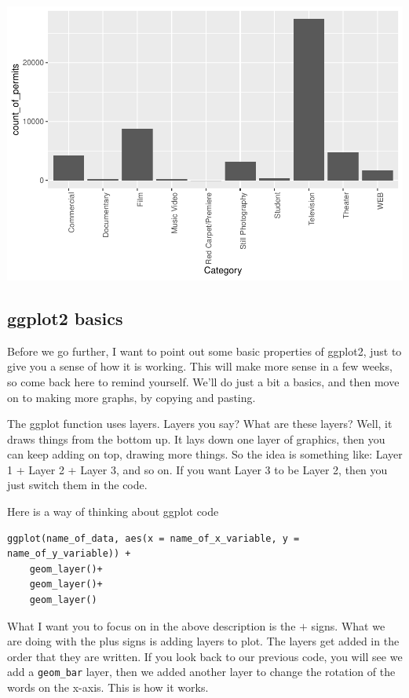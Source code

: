 \documentclass[]{book}
\begin{document}
\includegraphics{Statistics_Lab_files/figure-latex/1categoryB-1.pdf}

\subsection{ggplot2 basics}\label{ggplot2-basics}

Before we go further, I want to point out some basic properties of
ggplot2, just to give you a sense of how it is working. This will make
more sense in a few weeks, so come back here to remind yourself. We'll
do just a bit a basics, and then move on to making more graphs, by
copying and pasting.

The ggplot function uses layers. Layers you say? What are these layers?
Well, it draws things from the bottom up. It lays down one layer of
graphics, then you can keep adding on top, drawing more things. So the
idea is something like: Layer 1 + Layer 2 + Layer 3, and so on. If you
want Layer 3 to be Layer 2, then you just switch them in the code.

Here is a way of thinking about ggplot code

\begin{verbatim}
ggplot(name_of_data, aes(x = name_of_x_variable, y = name_of_y_variable)) +
    geom_layer()+
    geom_layer()+
    geom_layer()
\end{verbatim}

What I want you to focus on in the above description is the \(+\) signs.
What we are doing with the plus signs is adding layers to plot. The
layers get added in the order that they are written. If you look back to
our previous code, you will see we add a \texttt{geom\_bar} layer, then
we added another layer to change the rotation of the words on the
x-axis. This is how it works.
\end{document}
